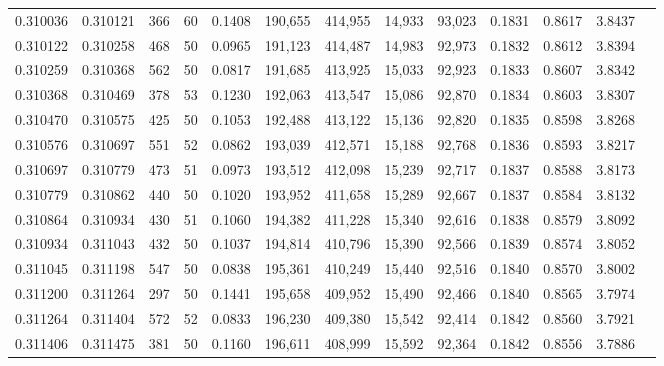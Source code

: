 \begin{tabular}{rrrrrrrrrrrrr}
0.310036 & 0.310121 &   366 &  60 &                                     0.1408 & 190,655 & 414,955 &  14,933 &  93,023 & 0.1831 & 0.8617 & 3.8437 \\
0.310122 & 0.310258 &   468 &  50 &                                     0.0965 & 191,123 & 414,487 &  14,983 &  92,973 & 0.1832 & 0.8612 & 3.8394 \\
0.310259 & 0.310368 &   562 &  50 &                                     0.0817 & 191,685 & 413,925 &  15,033 &  92,923 & 0.1833 & 0.8607 & 3.8342 \\
0.310368 & 0.310469 &   378 &  53 &                                     0.1230 & 192,063 & 413,547 &  15,086 &  92,870 & 0.1834 & 0.8603 & 3.8307 \\
0.310470 & 0.310575 &   425 &  50 &                                     0.1053 & 192,488 & 413,122 &  15,136 &  92,820 & 0.1835 & 0.8598 & 3.8268 \\
0.310576 & 0.310697 &   551 &  52 &                                     0.0862 & 193,039 & 412,571 &  15,188 &  92,768 & 0.1836 & 0.8593 & 3.8217 \\
0.310697 & 0.310779 &   473 &  51 &                                     0.0973 & 193,512 & 412,098 &  15,239 &  92,717 & 0.1837 & 0.8588 & 3.8173 \\
0.310779 & 0.310862 &   440 &  50 &                                     0.1020 & 193,952 & 411,658 &  15,289 &  92,667 & 0.1837 & 0.8584 & 3.8132 \\
0.310864 & 0.310934 &   430 &  51 &                                     0.1060 & 194,382 & 411,228 &  15,340 &  92,616 & 0.1838 & 0.8579 & 3.8092 \\
0.310934 & 0.311043 &   432 &  50 &                                     0.1037 & 194,814 & 410,796 &  15,390 &  92,566 & 0.1839 & 0.8574 & 3.8052 \\
0.311045 & 0.311198 &   547 &  50 &                                     0.0838 & 195,361 & 410,249 &  15,440 &  92,516 & 0.1840 & 0.8570 & 3.8002 \\
0.311200 & 0.311264 &   297 &  50 &                                     0.1441 & 195,658 & 409,952 &  15,490 &  92,466 & 0.1840 & 0.8565 & 3.7974 \\
0.311264 & 0.311404 &   572 &  52 &                                     0.0833 & 196,230 & 409,380 &  15,542 &  92,414 & 0.1842 & 0.8560 & 3.7921 \\
0.311406 & 0.311475 &   381 &  50 &                                     0.1160 & 196,611 & 408,999 &  15,592 &  92,364 & 0.1842 & 0.8556 & 3.7886 \\

\end{tabular}
